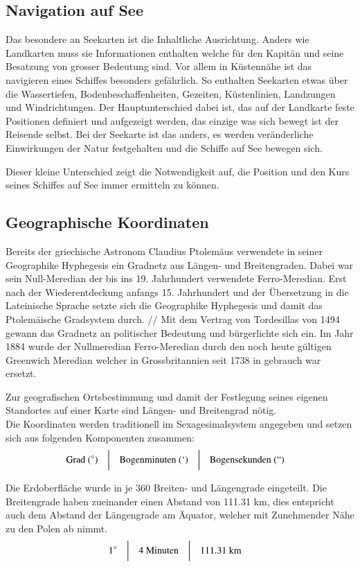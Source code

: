 \begin{refsection}
\begin{refsection}
\section{Navigation auf See}
Das besondere an Seekarten ist die Inhaltliche Ausrichtung. Anders wie Landkarten muss sie Informationen enthalten welche für den Kapitän und seine Besatzung von grosser Bedeutung sind. Vor allem in Küstennähe ist das navigieren eines Schiffes besonders gefährlich. So enthalten Seekarten etwas über die Wassertiefen, Bodenbeschaffenheiten, Gezeiten, Küstenlinien, Landzungen und Windrichtungen.
Der Hauptunterschied dabei ist, das auf der Landkarte feste Positionen definiert und aufgezeigt werden, das einzige was sich bewegt ist der Reisende selbst. Bei der Seekarte ist das anders, es werden veränderliche Einwirkungen der Natur festgehalten und die Schiffe auf See bewegen sich.

Dieser kleine Unterschied zeigt die Notwendigkeit auf, die Position und den Kurs seines Schiffes auf See immer ermitteln zu können.


\subsection{Geographische Koordinaten}
Bereits der griechische Astronom Claudius Ptolemäus verwendete in seiner Geographike Hyphegesis ein Gradnetz aus Längen- und Breitengraden. Dabei war sein Null-Meredian der bis ins 19. Jahrhundert verwendete Ferro-Meredian. Erst nach der Wiederentdeckung anfangs 15. Jahrhundert und der Übersetzung in die Lateinische Sprache setzte sich die Geographike Hyphegesis und damit das Ptolemäische Gradsystem durch. //
Mit dem Vertrag von Tordesillas von 1494 gewann das Gradnetz an politischer Bedeutung und bürgerlichte sich ein.
Im Jahr 1884 wurde der Nullmeredian Ferro-Meredian durch den noch heute gültigen Greenwich Meredian welcher in Grossbritannien seit 1738 in gebrauch war ersetzt.

Zur geografischen Ortsbestimmung und damit der Festlegung seines eigenen Standortes auf einer Karte sind Längen- und Breitengrad nötig. \\
Die Koordinaten werden traditionell im Sexagesimalsystem angegeben und setzen sich aus folgenden Komponenten zusammen:
\[
\begin{aligned}
&\text{Grad } (^{\circ})
&
&\text{\bigg \vert}
&
&\text{Bogenminuten } (`)
&
&\text{\bigg \vert}
&
&\text{Bogensekunden } (``)
\end{aligned}
\]

Die Erdoberfläche wurde in je 360 Breiten- und Längengrade eingeteilt. Die Breitengrade haben zueinander einen Abstand von 111.31 km, dies entspricht auch dem Abstand der Längengrade am Äquator, welcher mit Zunehmender Nähe zu den Polen ab nimmt.
\[
\begin{aligned}
&1^{\circ}
&
&\text{\bigg \vert}
&
&4 \text{ Minuten}
&
&\text{\bigg \vert}
&
&111.31\text{ km}
\end{aligned}
\]


\end{refsection}
\end{refsection}
